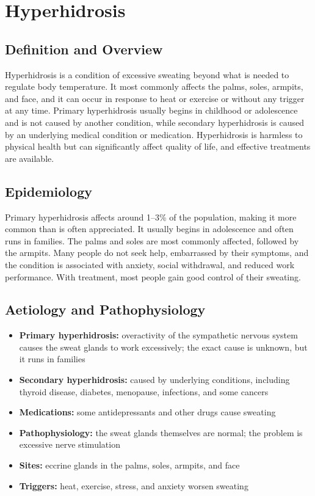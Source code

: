 \chapter{Hyperhidrosis}

\section*{Definition and Overview}
Hyperhidrosis is a condition of excessive sweating beyond what is needed to regulate body temperature. It most commonly affects the palms, soles, armpits, and face, and it can occur in response to heat or exercise or without any trigger at any time. Primary hyperhidrosis usually begins in childhood or adolescence and is not caused by another condition, while secondary hyperhidrosis is caused by an underlying medical condition or medication. Hyperhidrosis is harmless to physical health but can significantly affect quality of life, and effective treatments are available.

\section*{Epidemiology}
Primary hyperhidrosis affects around 1--3\% of the population, making it more common than is often appreciated. It usually begins in adolescence and often runs in families. The palms and soles are most commonly affected, followed by the armpits. Many people do not seek help, embarrassed by their symptoms, and the condition is associated with anxiety, social withdrawal, and reduced work performance. With treatment, most people gain good control of their sweating.

\section*{Aetiology and Pathophysiology}
\begin{itemize}
    \item \textbf{Primary hyperhidrosis:} overactivity of the sympathetic nervous system causes the sweat glands to work excessively; the exact cause is unknown, but it runs in families
    \item \textbf{Secondary hyperhidrosis:} caused by underlying conditions, including thyroid disease, diabetes, menopause, infections, and some cancers
    \item \textbf{Medications:} some antidepressants and other drugs cause sweating
    \item \textbf{Pathophysiology:} the sweat glands themselves are normal; the problem is excessive nerve stimulation
    \item \textbf{Sites:} eccrine glands in the palms, soles, armpits, and face
    \item \textbf{Triggers:} heat, exercise, stress, and anxiety worsen sweating
\end{itemize}

